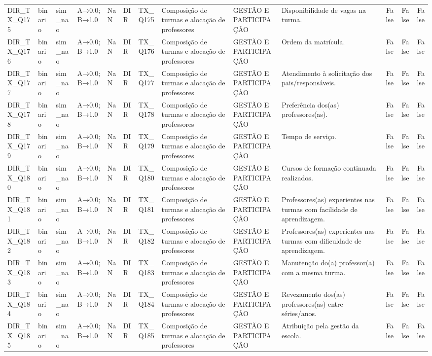 \begin{tabular}{llllllllllrrr}
DIR\_TX\_Q175 & binario & sim\_nao & A→0.0; B→1.0 & NaN & DIR & TX\_Q175 & Composição de turmas e alocação de professores & GESTÃO E PARTICIPAÇÃO & Disponibilidade de vagas na turma. & False & False & False \\
DIR\_TX\_Q176 & binario & sim\_nao & A→0.0; B→1.0 & NaN & DIR & TX\_Q176 & Composição de turmas e alocação de professores & GESTÃO E PARTICIPAÇÃO & Ordem da matrícula. & False & False & False \\
DIR\_TX\_Q177 & binario & sim\_nao & A→0.0; B→1.0 & NaN & DIR & TX\_Q177 & Composição de turmas e alocação de professores & GESTÃO E PARTICIPAÇÃO & Atendimento à solicitação dos pais/responsáveis. & False & False & False \\
DIR\_TX\_Q178 & binario & sim\_nao & A→0.0; B→1.0 & NaN & DIR & TX\_Q178 & Composição de turmas e alocação de professores & GESTÃO E PARTICIPAÇÃO & Preferência dos(as) professores(as). & False & False & False \\
DIR\_TX\_Q179 & binario & sim\_nao & A→0.0; B→1.0 & NaN & DIR & TX\_Q179 & Composição de turmas e alocação de professores & GESTÃO E PARTICIPAÇÃO & Tempo de serviço. & False & False & False \\
DIR\_TX\_Q180 & binario & sim\_nao & A→0.0; B→1.0 & NaN & DIR & TX\_Q180 & Composição de turmas e alocação de professores & GESTÃO E PARTICIPAÇÃO & Cursos de formação continuada realizados. & False & False & False \\
DIR\_TX\_Q181 & binario & sim\_nao & A→0.0; B→1.0 & NaN & DIR & TX\_Q181 & Composição de turmas e alocação de professores & GESTÃO E PARTICIPAÇÃO & Professores(as) experientes nas turmas com facilidade de aprendizagem. & False & False & False \\
DIR\_TX\_Q182 & binario & sim\_nao & A→0.0; B→1.0 & NaN & DIR & TX\_Q182 & Composição de turmas e alocação de professores & GESTÃO E PARTICIPAÇÃO & Professores(as) experientes nas turmas com dificuldade de aprendizagem. & False & False & False \\
DIR\_TX\_Q183 & binario & sim\_nao & A→0.0; B→1.0 & NaN & DIR & TX\_Q183 & Composição de turmas e alocação de professores & GESTÃO E PARTICIPAÇÃO & Manutenção do(a) professor(a) com a mesma turma. & False & False & False \\
DIR\_TX\_Q184 & binario & sim\_nao & A→0.0; B→1.0 & NaN & DIR & TX\_Q184 & Composição de turmas e alocação de professores & GESTÃO E PARTICIPAÇÃO & Revezamento dos(as) professores(as) entre séries/anos. & False & False & False \\
DIR\_TX\_Q185 & binario & sim\_nao & A→0.0; B→1.0 & NaN & DIR & TX\_Q185 & Composição de turmas e alocação de professores & GESTÃO E PARTICIPAÇÃO & Atribuição pela gestão da escola. & False & False & False \\

\end{tabular}
